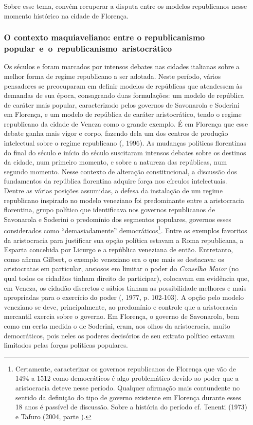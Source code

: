 Sobre esse tema, convém recuperar a disputa entre os modelos
republicanos nesse momento histórico na cidade de Florença.

\subsubsection{O contexto maquiaveliano: entre o republicanismo popular~e~o~republicanismo~aristocrático}

Os séculos  e  foram marcados por intensos debates nas cidades
italianas sobre a melhor forma de regime republicano a ser adotada.
Neste período, vários pensadores se preocuparam em definir modelos de
repúblicas que atendessem às demandas de sua época, consagrando duas
formulações: um modelo de república de caráter mais popular,
caracterizado pelos governos de Savonarola e Soderini em Florença, e um
modelo de república de caráter aristocrático, tendo o regime republicano
da cidade de Veneza como o grande exemplo. É em Florença que esse debate
ganha mais vigor e corpo, fazendo dela um dos centros de produção
intelectual sobre o regime republicano (, 1996). As mudanças
políticas florentinas do final do século  e início do século 
suscitaram intensos debates sobre os destinos da cidade, num primeiro
momento, e sobre a natureza das repúblicas, num segundo momento. Nesse
contexto de alteração constitucional, a discussão dos fundamentos da
república florentina adquire força nos círculos intelectuais. Dentre as
várias posições assumidas, a defesa da instalação de um regime
republicano inspirado no modelo veneziano foi predominante entre a
aristocracia florentina, grupo político que identificava nos governos
republicanos de Savonarola e Soderini o predomínio dos segmentos
populares, governos esses considerados como ``demasiadamente''
democráticos\footnote{Certamente, caracterizar os governos republicanos
  de Florença que vão de 1494 a 1512 como democráticos é algo
  problemático devido ao poder que a aristocracia deteve nesse período.
  Qualquer afirmação mais contundente no sentido da definição do tipo de
  governo existente em Florença durante esses 18 anos é passível de
  discussão. Sobre a história do período cf. Tenenti (1973) e Tafuro
  (2004, parte ).}. Entre os exemplos favoritos da aristocracia para
justificar sua opção política estavam a Roma republicana, a Esparta
concebida por Licurgo e a república veneziana de então. Entretanto, como
afirma Gilbert, o exemplo veneziano era o que mais se destacava: os
aristocratas em particular, ansiosos em limitar o poder do
\emph{Conselho Maior} (no qual todos os cidadãos tinham direito de
participar), colocavam em evidência que, em Veneza, os cidadão discretos
e sábios tinham as possibilidade melhores e mais apropriadas para o
exercício do poder (, 1977, p. 102-103). A opção pelo modelo
veneziano se deve, principalmente, ao predomínio e controle que a
aristocracia mercantil exercia sobre o governo. Em Florença, o governo
de Savonarola, bem como em certa medida o de Soderini, eram, aos olhos
da aristocracia, muito democráticos, pois neles os poderes decisórios de
seu extrato político estavam limitados pelas forças políticas populares.

